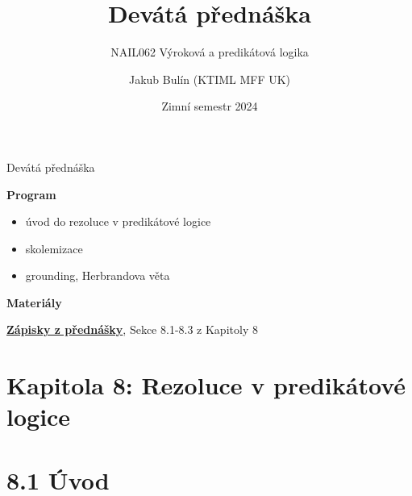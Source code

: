 \documentclass{beamer}
\title{Devátá přednáška}
\subtitle{NAIL062 Výroková a predikátová logika}
\author{Jakub Bulín (KTIML MFF UK)}
\date{Zimní semestr 2024}
\begin{document}
\maketitle


\begin{frame}{Devátá přednáška}

    \textbf{Program}
        \begin{itemize}
            \item úvod do rezoluce v predikátové logice
            \item skolemizace
            \item grounding, Herbrandova věta
        \end{itemize}

    \textbf{Materiály}

        \href{https://github.com/jbulin-mff-uk/nail062/raw/main/lecture/lecture-notes/lecture-notes.pdf}{\alert{\textbf{Zápisky z přednášky}}}, Sekce 8.1-8.3 z Kapitoly 8

\end{frame}


\section{\sc Kapitola 8: Rezoluce v predikátové logice}


\section{8.1 Úvod}
\end{document}
